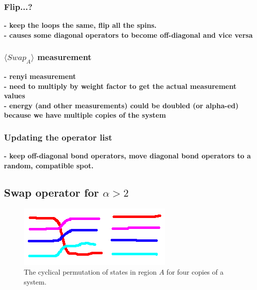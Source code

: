 \documentclass[prb,aps,twocolumn,floatfix,amsmath,amssymb,superscriptaddress,tightenlines]{revtex4}
\begin{document}
\subsubsection{Flip...?}
\noindent 
{\bf
- keep the loops the same, flip all the spins.\\
- causes some diagonal operators to become off-diagonal and vice versa
}
\subsubsection{$\langle Swap_A \rangle$ measurement}
\noindent
{\bf 
- renyi measurement \\
- need to multiply by weight factor to get the actual measurement values\\
- energy (and other measurements) could be doubled (or alpha-ed) because we have multiple copies of the system
}
\subsubsection{Updating the operator list}
\noindent
{\bf- keep off-diagonal bond operators, move diagonal bond operators to a random, compatible spot.}
	
\subsection{Swap operator for $\alpha > 2$}

\begin{figure} {
\includegraphics[width=2.4 in]{swap.png} \caption{ 
\label{swap_4} 
The cyclical permutation of states in region $A$ for four copies of a system.
}
} \end{figure}


\end{document}

